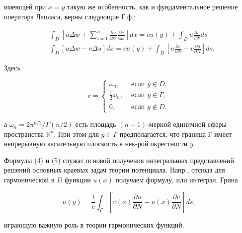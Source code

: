 \documentclass[10pt]{article}
\begin{document}
имеющей при $x=y$ такую же особенность, как и фундаментальное решение оператора Лапласа, верны следующие Г.ф.:



\[

\begin{aligned}

& \int_{D}\left[u \Delta w+\sum_{i=1}^{n} \frac{\partial u}{\partial x^{i}} \frac{\partial v}{\partial x^{j}}\right] d x=c u(y)+\int_{D} u \frac{\partial v}{\partial N} d s \\

& \int_{D}[u \Delta w-v \Delta u] d x=c u(y)+\int_{D}\left[u \frac{\partial v}{\partial N}-v \frac{\partial u}{\partial N}\right] d s .

\end{aligned}

\]



Здесь



\[

c= \begin{cases}\omega_{n}, & \text { если } y \in D, \\ \frac{1}{2} \omega_{n}, & \text { если } y \in \Gamma, \\ 0, & \text { если } y \notin \bar{D},\end{cases}

\]



а $\omega_{n}=2 \pi^{n / 2} / \Gamma(n / 2)$ есть площадь $(n-1)$-мерной единичной сферы пространства $\mathbb{R}^{n}$. При этом для $y \in \Gamma$ предполагается, что граница Г имеет непрерывную касательную плоскость в нек-рой окрестности $y$.



Формулы (4) и (5) служат основой получения интегральных представлений решений основных краевых задач теории потенциала. Напр., отсюда для гармонической в $D$ функции $u(x)$ получаем формулу, или интеграл, Грина



\[

u(y)=\frac{1}{c} \int_{\Gamma}\left[v(x) \frac{\partial u}{\partial N}-u(x) \frac{\partial v}{\partial N}\right] d s,

\]



играющую важную роль в теории гармонических функций.
\end{document}
